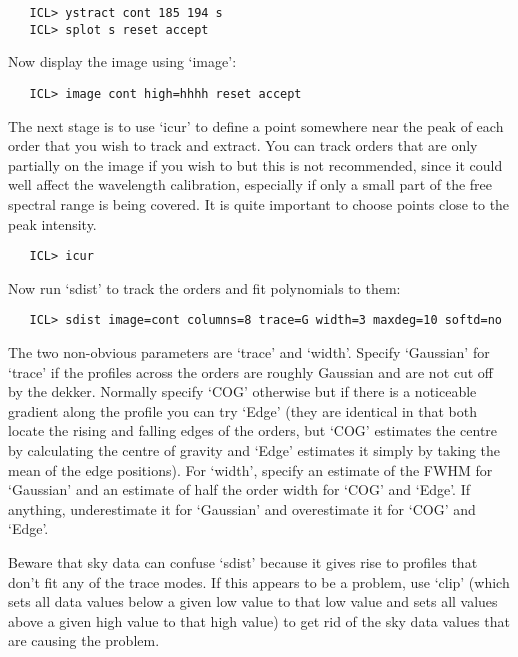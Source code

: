 \begin{verbatim}
   ICL> ystract cont 185 194 s
   ICL> splot s reset accept
\end{verbatim}

   Now display the image using `image':

\begin{verbatim}
   ICL> image cont high=hhhh reset accept
\end{verbatim}

   The next stage is to use `icur' to define a point somewhere near the
   peak of each order that you wish to track and extract. You can track
   orders that are only partially on the image if you wish to but this
   is not recommended, since it could well affect the wavelength
   calibration, especially if only a small part of the free spectral
   range is being covered. It is quite important to choose points close
   to the peak intensity.

\begin{verbatim}
   ICL> icur
\end{verbatim}

   Now run `sdist' to track the orders and fit polynomials to them:

\begin{verbatim}
   ICL> sdist image=cont columns=8 trace=G width=3 maxdeg=10 softd=no
\end{verbatim}

   The two non-obvious parameters are `trace' and `width'. Specify
   `Gaussian' for `trace' if the profiles across the orders are roughly
   Gaussian and are not cut off by the dekker. Normally specify `COG'
   otherwise but if there is a noticeable gradient along the profile you
   can try `Edge' (they are identical in that both locate the rising and
   falling edges of the orders, but `COG' estimates the centre by
   calculating the centre of gravity and `Edge' estimates it simply by
   taking the mean of the edge positions). For `width', specify an
   estimate of the FWHM for `Gaussian' and an estimate of half the order
   width for `COG' and `Edge'. If anything, underestimate it for
   `Gaussian' and overestimate it for `COG' and `Edge'.

   Beware that sky data can confuse `sdist' because it gives rise to
   profiles that don't fit any of the trace modes. If this appears to be
   a problem, use `clip' (which sets all data values below a given low
   value to that low value and sets all values above a given high value
   to that high value) to get rid of the sky data values that are
   causing the problem.

